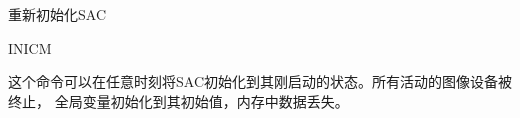 \label{cmd:inicm}

重新初始化SAC

\begin{SACSTX}
INICM
\end{SACSTX}

这个命令可以在任意时刻将SAC初始化到其刚启动的状态。所有活动的图像设备被终止，
全局变量初始化到其初始值，内存中数据丢失。

